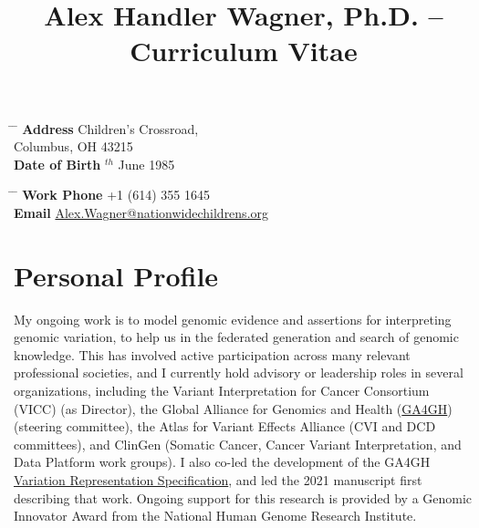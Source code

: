 \documentclass[10pt]{article} %
\begin{document}

\title{Alex Handler Wagner, Ph.D. -- Curriculum Vitae} %


\parbox{0.5\textwidth}{ %
\begin{tabbing} %
\hspace{3cm} \= \hspace{4cm} \= \kill %
{\bf Address}  Children's Crossroad,\\ %
\> Columbus, OH 43215 \\ %
{\bf Date of Birth} $^{th}$ June 1985 \\ %
\end{tabbing}}
\hfill %
\parbox{0.5\textwidth}{ %
\begin{tabbing} %
\hspace{3cm} \= \hspace{4cm} \= \kill %
{\bf Work Phone} \> +1 (614) 355 1645 \\ %
{\bf Email} \> \href{mailto:Alex.Wagner@nationwidechildrens.org}{Alex.Wagner@nationwidechildrens.org} \\ %
\end{tabbing}}


\section{Personal Profile}

My ongoing work is to model genomic evidence and assertions for interpreting genomic variation, to help us in the federated
generation and search of genomic knowledge.  This has involved active participation across many relevant professional societies,
and I currently hold advisory or leadership roles in several organizations, including the Variant Interpretation for Cancer Consortium
(VICC) (as Director), the Global Alliance for Genomics and Health (\href{https://ga4gh.org}{GA4GH}) (steering committee), the Atlas
for Variant Effects Alliance (CVI and DCD committees), and ClinGen (Somatic Cancer, Cancer Variant Interpretation, and Data
Platform work groups). I also co-led the development of the GA4GH \href{https://vrs.ga4gh.org}{Variation Representation Specification},
and led the 2021 manuscript first describing that work. Ongoing support for this research is provided by a Genomic Innovator Award
from the National Human Genome Research Institute.
\end{document}
